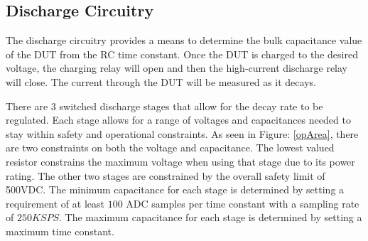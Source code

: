 \subsection{Discharge Circuitry}
The discharge circuitry provides a means to determine the bulk capacitance value of the DUT from the RC time constant. Once the DUT is charged to the desired voltage, the charging relay will open and then the high-current discharge relay will close. The current through the DUT will be measured as it decays.

There are 3 switched discharge stages that allow for the decay rate to be regulated. Each stage allows for a range of voltages and capacitances needed to stay within safety and operational constraints. As seen in Figure: \ref{opArea}, there are two constraints on both the voltage and capacitance. The lowest valued resistor constrains the maximum voltage when using that stage due to its power rating. The other two stages are constrained by the overall safety limit of 500VDC. The minimum capacitance for each stage is determined by setting a requirement of at least $100$ ADC samples per time constant with a sampling rate of $250KSPS$. The maximum capacitance for each stage is determined by setting a maximum time constant.


